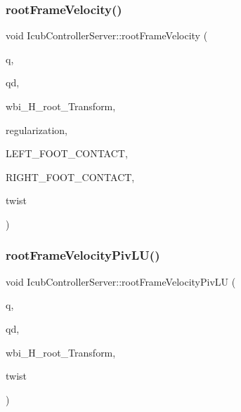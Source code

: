 \hypertarget{classIcubControllerServer_a032c035880f8ec2b77ef14521be6e75a}{}\label{classIcubControllerServer_a032c035880f8ec2b77ef14521be6e75a} 
\subsubsection{\texorpdfstring{root\+Frame\+Velocity()}{rootFrameVelocity()}}
{\footnotesize\ttfamily void Icub\+Controller\+Server\+::root\+Frame\+Velocity (\begin{DoxyParamCaption}\item[{Eigen\+::\+Vector\+Xd \&}]{q,  }\item[{Eigen\+::\+Vector\+Xd \&}]{qd,  }\item[{i\+Dyn\+Tree\+::\+Transform \&}]{wbi\+\_\+\+H\+\_\+root\+\_\+\+Transform,  }\item[{double}]{regularization,  }\item[{int}]{L\+E\+F\+T\+\_\+\+F\+O\+O\+T\+\_\+\+C\+O\+N\+T\+A\+CT,  }\item[{int}]{R\+I\+G\+H\+T\+\_\+\+F\+O\+O\+T\+\_\+\+C\+O\+N\+T\+A\+CT,  }\item[{Eigen\+::\+Vector\+Xd \&}]{twist }\end{DoxyParamCaption})}

\hypertarget{classIcubControllerServer_a27211ecba9fc8618733bcaea9ff7d140}{}\label{classIcubControllerServer_a27211ecba9fc8618733bcaea9ff7d140} 
\subsubsection{\texorpdfstring{root\+Frame\+Velocity\+Piv\+L\+U()}{rootFrameVelocityPivLU()}\hspace{0.1cm}{\footnotesize\ttfamily [1/2]}}
{\footnotesize\ttfamily void Icub\+Controller\+Server\+::root\+Frame\+Velocity\+Piv\+LU (\begin{DoxyParamCaption}\item[{Eigen\+::\+Vector\+Xd \&}]{q,  }\item[{Eigen\+::\+Vector\+Xd \&}]{qd,  }\item[{i\+Dyn\+Tree\+::\+Transform \&}]{wbi\+\_\+\+H\+\_\+root\+\_\+\+Transform,  }\item[{Eigen\+::\+Vector\+Xd \&}]{twist }\end{DoxyParamCaption})}

